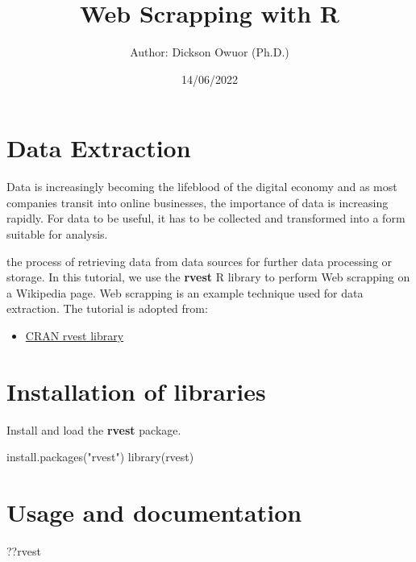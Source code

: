 \documentclass[
]{article}
\title{Web Scrapping with R}
\author{Author: Dickson Owuor (Ph.D.)}
\date{14/06/2022}
\newenvironment{Shaded}{\begin{snugshade}}{\end{snugshade}}
\newcommand{\FunctionTok}[1]{\textcolor[rgb]{0.00,0.00,0.00}{#1}}
\newcommand{\NormalTok}[1]{#1}
\newcommand{\StringTok}[1]{\textcolor[rgb]{0.31,0.60,0.02}{#1}}
\providecommand{\tightlist}{%
  \setlength{\itemsep}{0pt}\setlength{\parskip}{0pt}}
\begin{document}
\maketitle

{
\setcounter{tocdepth}{2}
\tableofcontents
}
\hypertarget{data-extraction}{%
\section{Data Extraction}\label{data-extraction}}

Data is increasingly becoming the lifeblood of the digital economy and
as most companies transit into online businesses, the importance of data
is increasing rapidly. For data to be useful, it has to be collected and
transformed into a form suitable for analysis.

the process of retrieving data from data sources for further data
processing or storage. In this tutorial, we use the \textbf{rvest} R
library to perform Web scrapping on a Wikipedia page. Web scrapping is
an example technique used for data extraction. The tutorial is adopted
from:

\begin{itemize}
\tightlist
\item
  \href{https://cran.r-project.org/web/packages/rvest/index.html}{CRAN
  rvest library}
\end{itemize}

\hypertarget{installation-of-libraries}{%
\section{Installation of libraries}\label{installation-of-libraries}}

Install and load the \textbf{rvest} package.

\begin{Shaded}
\begin{Highlighting}[]
\FunctionTok{install.packages}\NormalTok{(}\StringTok{"rvest"}\NormalTok{)}
\FunctionTok{library}\NormalTok{(rvest)}
\end{Highlighting}
\end{Shaded}

\hypertarget{usage-and-documentation}{%
\section{Usage and documentation}\label{usage-and-documentation}}

\begin{Shaded}
\begin{Highlighting}[]
\NormalTok{??rvest}
\end{Highlighting}
\end{Shaded}
\end{document}
